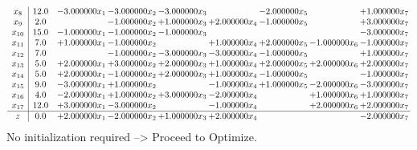 \documentclass[10pt]{article}
\begin{document}
\[\begin{array}{c| c c@{\hskip 2pt} c@{\hskip 2pt} c@{\hskip 2pt} c@{\hskip 2pt} c@{\hskip 2pt} c@{\hskip 2pt} c@{\hskip 2pt} }
 x_{8}   &  12.0 & -3.000000 x_{1} & -3.000000 x_{2} & -3.000000 x_{3} &   & -2.000000 x_{5} &   & + 1.000000 x_{7}\\
 x_{9}   &  2.0  &   & -1.000000 x_{2} & + 1.000000 x_{3} & + 2.000000 x_{4} & -1.000000 x_{5} &   & + 3.000000 x_{7}\\
 x_{10}   &  15.0 & -1.000000 x_{1} & -1.000000 x_{2} & -1.000000 x_{3} &    &    &   & -3.000000 x_{7}\\
 x_{11}   &  7.0 & + 1.000000 x_{1} & -1.000000 x_{2} &   & + 1.000000 x_{4} & + 2.000000 x_{5} & -1.000000 x_{6} & -1.000000 x_{7}\\
 x_{12}   &  7.0  &   & -1.000000 x_{2} & -3.000000 x_{3} & -3.000000 x_{4} & -1.000000 x_{5} &   & + 1.000000 x_{7}\\
 x_{13}   &  5.0 & + 2.000000 x_{1} & + 3.000000 x_{2} & + 2.000000 x_{3} & + 1.000000 x_{4} & + 2.000000 x_{5} & + 2.000000 x_{6} & + 2.000000 x_{7}\\
 x_{14}   &  5.0 & + 2.000000 x_{1} & -1.000000 x_{2} & + 2.000000 x_{3} & + 1.000000 x_{4} & -1.000000 x_{5} &   & -1.000000 x_{7}\\
 x_{15}   &  9.0 & -3.000000 x_{1} & + 1.000000 x_{2} &   & -1.000000 x_{4} & + 1.000000 x_{5} & -2.000000 x_{6} & -3.000000 x_{7}\\
 x_{16}   &  4.0 & -2.000000 x_{1} & + 1.000000 x_{2} & + 3.000000 x_{3} & -2.000000 x_{4} &   & + 1.000000 x_{6} & + 1.000000 x_{7}\\
 x_{17}   &  12.0 & + 3.000000 x_{1} & -3.000000 x_{2} &   & -1.000000 x_{4} &   & + 2.000000 x_{6} & + 2.000000 x_{7}\\
\hline
z    &  0.0 & + 2.000000 x_{1} & -2.000000 x_{2} & + 1.000000 x_{3} & + 2.000000 x_{4} &    &   & -2.000000 x_{7}\\
\end{array}\]
No initialization required --> Proceed to Optimize. 
\end{document}
